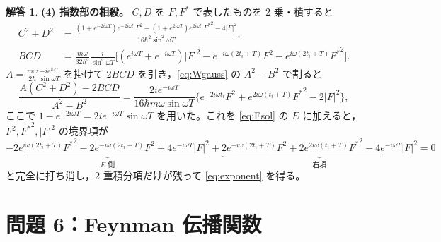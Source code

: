 \documentclass[dvipdfmx, uplatex]{jsarticle}
\theoremstyle{definition}
\newtheorem*{sol}{解答}
\begin{document}
\begin{sol}
\par\smallskip
\textbf{(4) 指数部の相殺。}
$C,D$ を $F,F^*$ で表したものを 2 乗・積すると
\begin{align*}
    C^2+D^2
    &=\frac{(1+e^{-2i\omega T})e^{-2i\omega t_i}F^2+(1+e^{2i\omega T})e^{2i\omega t_i}{F^*}^2-4|F|^2}{16\hbar^2\sin^2\omega T},\\
    BCD
    &=\frac{m\omega}{32\hbar^3}\frac{i}{\sin^3\omega T}
    \big[(e^{i\omega T}+e^{-i\omega T})|F|^2-e^{-i\omega(2t_i+T)}F^2-e^{i\omega(2t_i+T)}{F^*}^2\big].
\end{align*}
$A=\frac{m\omega}{2\hbar}\frac{-ie^{i\omega T}}{\sin\omega T}$ を掛けて $2BCD$ を引き，\eqref{eq:Wgauss} の $A^2-B^2$ で割ると
\[
    \frac{A(C^2+D^2)-2BCD}{A^2-B^2}
    =\frac{2ie^{-i\omega T}}{16\hbar m\omega\sin\omega T}
    \Big\{e^{-2i\omega t_i}F^2+e^{2i\omega(t_i+T)}{F^*}^2-2|F|^2\Big\},
\]
ここで $1-e^{-2i\omega T}=2ie^{-i\omega T}\sin\omega T$ を用いた。これを \eqref{eq:Esol} の $E$ に加えると，
$F^2,{F^*}^2,|F|^2$ の境界項が
\[
    \underbrace{-2e^{i\omega(2t_i+T)}{F^*}^2-2e^{-i\omega(2t_i+T)}F^2+4e^{-i\omega T}|F|^2}_{E\text{ 側}}
    +\underbrace{2e^{-i\omega(2t_i+T)}F^2+2e^{2i\omega(t_i+T)}{F^*}^2-4e^{-i\omega T}|F|^2}_{\text{右項}}=0
\]
と完全に打ち消し，2 重積分項だけが残って \eqref{eq:exponent} を得る。
\end{sol}

\section{問題 6：Feynman 伝播関数}
\end{document}

